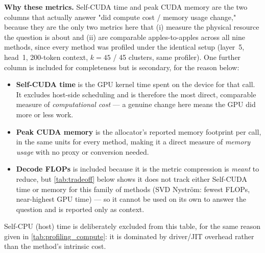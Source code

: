 \noindent \textbf{Why these metrics.} Self-CUDA time and peak CUDA memory are the two columns
that actually answer "did compute cost / memory usage change," because they are the only two
metrics here that (i) measure the physical resource the question is about and (ii) are
comparable apples-to-apples across all nine methods, since every method was profiled under the
identical setup (layer~5, head~1, 200-token context, $k=45$ / 45 clusters, same profiler). One
further column is included for completeness but is secondary, for the reason below:
\begin{itemize}
  \item \textbf{Self-CUDA time} is the GPU kernel time spent on the device for that call. It
    excludes host-side scheduling and is therefore the most direct, comparable measure of
    \emph{computational cost} --- a genuine change here means the GPU did more or less work.
  \item \textbf{Peak CUDA memory} is the allocator's reported memory footprint per call, in the
    same units for every method, making it a direct measure of \emph{memory usage} with no
    proxy or conversion needed.
  \item \textbf{Decode FLOPs} is included because it is the metric compression is \emph{meant}
    to reduce, but \autoref{tab:tradeoff} below shows it does not track either Self-CUDA time
    or memory for this family of methods (SVD Nyström: fewest FLOPs, near-highest GPU time) ---
    so it cannot be used on its own to answer the question and is reported only as context.
\end{itemize}
Self-CPU (host) time is deliberately excluded from this table, for the same reason given in
\autoref{tab:profiling_compute}: it is dominated by driver/JIT overhead rather than the
method's intrinsic cost.

